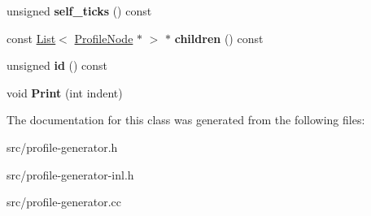 \begin{DoxyCompactItemize}
\item 
\hypertarget{classv8_1_1internal_1_1_profile_node_aaa113beacbfc9c2554aca110cac8ec46}{}unsigned {\bfseries self\+\_\+ticks} () const \label{classv8_1_1internal_1_1_profile_node_aaa113beacbfc9c2554aca110cac8ec46}

\item 
\hypertarget{classv8_1_1internal_1_1_profile_node_a379d97d5038a260a945ab224571180fb}{}const \hyperlink{classv8_1_1internal_1_1_list}{List}$<$ \hyperlink{classv8_1_1internal_1_1_profile_node}{Profile\+Node} $\ast$ $>$ $\ast$ {\bfseries children} () const \label{classv8_1_1internal_1_1_profile_node_a379d97d5038a260a945ab224571180fb}

\item 
\hypertarget{classv8_1_1internal_1_1_profile_node_aa4b4f78b613dded4aea38443b4105c3a}{}unsigned {\bfseries id} () const \label{classv8_1_1internal_1_1_profile_node_aa4b4f78b613dded4aea38443b4105c3a}

\item 
\hypertarget{classv8_1_1internal_1_1_profile_node_a197b95750e6a2103f6b2f87128b84b39}{}void {\bfseries Print} (int indent)\label{classv8_1_1internal_1_1_profile_node_a197b95750e6a2103f6b2f87128b84b39}

\end{DoxyCompactItemize}


The documentation for this class was generated from the following files\+:\begin{DoxyCompactItemize}
\item 
src/profile-\/generator.\+h\item 
src/profile-\/generator-\/inl.\+h\item 
src/profile-\/generator.\+cc\end{DoxyCompactItemize}
